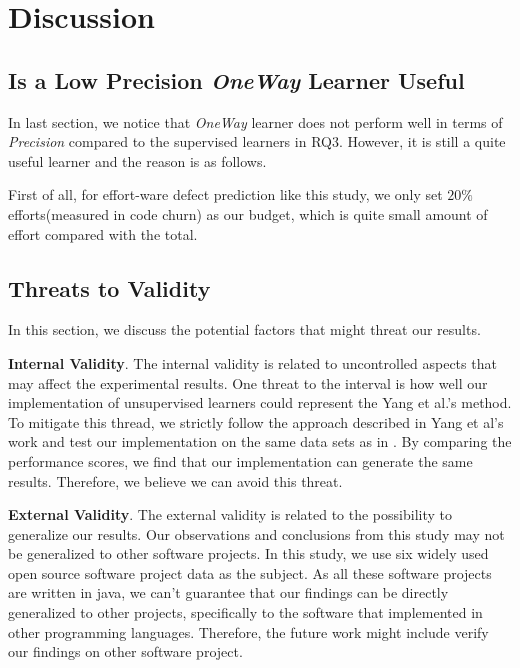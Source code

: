 \section{Discussion}
\subsection{ Is a Low Precision {\it OneWay} Learner Useful}


In last section, we notice that {\it OneWay} learner does not 
perform well in terms of {\it Precision} compared to the supervised learners
in RQ3. However, it is still a quite useful learner and the reason is as follows.

First of all, for effort-ware defect prediction like this study, we only set 
 $20\%$ efforts(measured in code churn) as our budget, which is quite small amount
 of effort compared with the total. 




 






\subsection{Threats to Validity}
In this section, we discuss the potential factors that might threat our results.

\textbf{Internal Validity}. The internal validity is related to uncontrolled
aspects that may affect the experimental results. One threat to the interval
is how well our implementation of unsupervised learners could represent 
the Yang et al.'s method. To mitigate this thread, we strictly follow 
the approach described in Yang et al's work and test our implementation on the
same data sets as in \cite{yang2016effort}. By comparing the performance
scores, we find that our implementation can generate the same results. Therefore,
we believe we can avoid this threat.

\textbf{External Validity}. The external validity is related to the
possibility to generalize our results. Our observations and conclusions
from this study may not be generalized to other software projects. In this study,
we use six widely used open source software project data as the subject.
As all these software projects are written in java, we can't  guarantee that
our findings can be directly generalized to other projects,
specifically to the software that implemented in other programming
languages. Therefore, the future work might include verify our findings on 
other software project.

